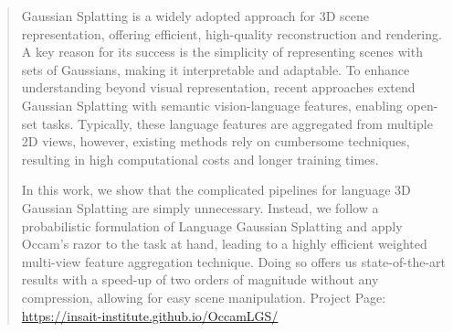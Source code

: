 \begin{abstract}


Gaussian Splatting is a widely adopted approach for 3D scene representation, offering efficient, high-quality reconstruction and rendering. A key reason for its success is the simplicity of representing scenes with sets of Gaussians, making it interpretable and adaptable. To enhance understanding beyond visual representation, recent approaches extend Gaussian Splatting with semantic vision-language features, enabling open-set tasks. Typically, these language features are aggregated from multiple 2D views, however, existing methods rely on cumbersome techniques, resulting in high computational costs and longer training times.

In this work, we show that the complicated pipelines for language 3D Gaussian Splatting are simply unnecessary. Instead, we follow a probabilistic formulation of Language Gaussian Splatting and apply Occam's razor to the task at hand, leading to a highly efficient weighted multi-view feature aggregation technique. Doing so offers us state-of-the-art results with a speed-up of two orders of magnitude without any compression, allowing for easy scene manipulation. Project Page: \url{https://insait-institute.github.io/OccamLGS/}

\end{abstract}